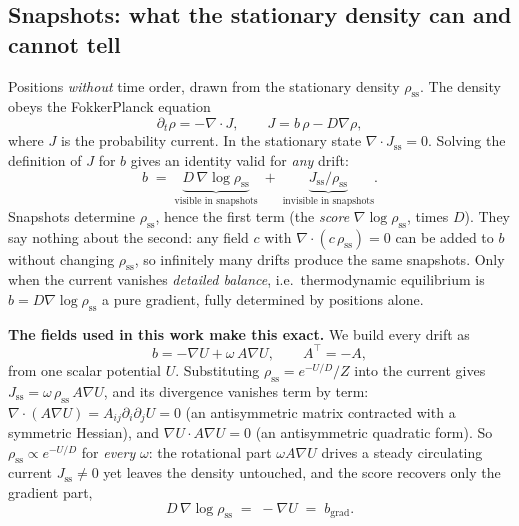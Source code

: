 \documentclass[11pt,a4paper]{article}
\newcommand{\rss}{\rho_{\mathrm{ss}}}
\begin{document}
\subsection{Snapshots: what the stationary density can and cannot tell}

Positions \emph{without} time order, drawn from the stationary density $\rss$. The density
obeys the Fokker\textendash Planck equation
\begin{equation}
  \partial_t \rho = -\nabla\!\cdot J,
  \qquad
  J = b\,\rho - D\nabla\rho ,
\end{equation}
where $J$ is the probability current. In the stationary state $\nabla\!\cdot J_{\mathrm{ss}}=0$.
Solving the definition of $J$ for $b$ gives an identity valid for \emph{any} drift:
\begin{equation}
  b \;=\; \underbrace{D\,\nabla\log\rss}_{\text{visible in snapshots}}
  \;+\; \underbrace{J_{\mathrm{ss}}/\rss}_{\text{invisible in snapshots}} .
  \label{eq:split}
\end{equation}
Snapshots determine $\rss$, hence the first term (the \emph{score} $\nabla\log\rss$, times
$D$). They say nothing about the second: any field $c$ with $\nabla\!\cdot(c\,\rss)=0$ can be
added to $b$ without changing $\rss$, so infinitely many drifts produce the same snapshots.
Only when the current vanishes \textemdash{} \emph{detailed balance}, i.e.\ thermodynamic
equilibrium \textemdash{} is $b = D\nabla\log\rss$ a pure gradient, fully determined by
positions alone.

\textbf{The fields used in this work make this exact.} We build every drift as
\begin{equation}
  b = -\nabla U + \omega\, A\nabla U ,
  \qquad A^\top = -A ,
  \label{eq:field}
\end{equation}
from one scalar potential $U$. Substituting $\rss = e^{-U/D}/Z$ into the current gives
$J_{\mathrm{ss}} = \omega\,\rss\, A\nabla U$, and its divergence vanishes term by term:
$\nabla\!\cdot(A\nabla U) = A_{ij}\partial_i\partial_j U = 0$ (an antisymmetric matrix
contracted with a symmetric Hessian), and $\nabla U\!\cdot\! A\nabla U = 0$ (an antisymmetric
quadratic form). So $\rss\propto e^{-U/D}$ for \emph{every} $\omega$: the rotational part
$\omega A\nabla U$ drives a steady circulating current $J_{\mathrm{ss}}\neq0$ yet leaves the
density untouched, and the score recovers only the gradient part,
\begin{equation}
  D\,\nabla\log\rss \;=\; -\nabla U \;=\; b_{\mathrm{grad}} .
  \label{eq:score}
\end{equation}
\end{document}
